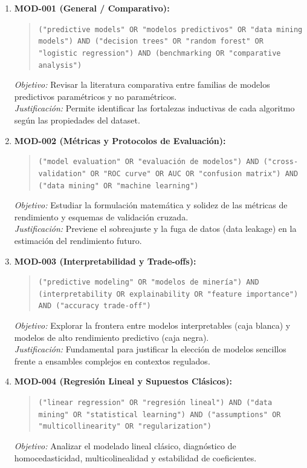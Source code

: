 \begin{enumerate}
  \item \textbf{MOD-001 (General / Comparativo):}
  \begin{quote}
  \texttt{("predictive models" OR "modelos predictivos" OR "data mining models") AND ("decision trees" OR "random forest" OR "logistic regression") AND (benchmarking OR "comparative analysis")}
  \end{quote}
  \textit{Objetivo:} Revisar la literatura comparativa entre familias de modelos predictivos paramétricos y no paramétricos.\\
  \textit{Justificación:} Permite identificar las fortalezas inductivas de cada algoritmo según las propiedades del dataset.
  \item \textbf{MOD-002 (Métricas y Protocolos de Evaluación):}
  \begin{quote}
  \texttt{("model evaluation" OR "evaluación de modelos") AND ("cross-validation" OR "ROC curve" OR AUC OR "confusion matrix") AND ("data mining" OR "machine learning")}
  \end{quote}
  \textit{Objetivo:} Estudiar la formulación matemática y solidez de las métricas de rendimiento y esquemas de validación cruzada.\\
  \textit{Justificación:} Previene el sobreajuste y la fuga de datos (data leakage) en la estimación del rendimiento futuro.
  \item \textbf{MOD-003 (Interpretabilidad y Trade-offs):}
  \begin{quote}
  \texttt{("predictive modeling" OR "modelos de minería") AND (interpretability OR explainability OR "feature importance") AND ("accuracy trade-off")}
  \end{quote}
  \textit{Objetivo:} Explorar la frontera entre modelos interpretables (caja blanca) y modelos de alto rendimiento predictivo (caja negra).\\
  \textit{Justificación:} Fundamental para justificar la elección de modelos sencillos frente a ensambles complejos en contextos regulados.
  \item \textbf{MOD-004 (Regresión Lineal y Supuestos Clásicos):}
  \begin{quote}
  \texttt{("linear regression" OR "regresión lineal") AND ("data mining" OR "statistical learning") AND ("assumptions" OR "multicollinearity" OR "regularization")}
  \end{quote}
  \textit{Objetivo:} Analizar el modelado lineal clásico, diagnóstico de homocedasticidad, multicolinealidad y estabilidad de coeficientes.\\

\end{enumerate}
